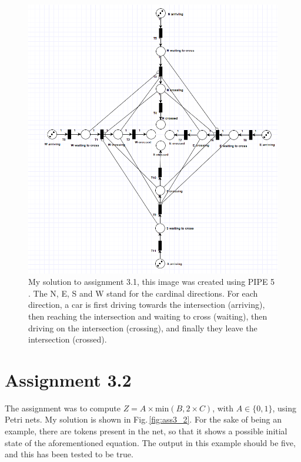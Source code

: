 \documentclass{article}
\begin{document}
	\begin{figure}
		\centering
		\includegraphics[width=1.0\textwidth]{Ass3_1}
		\caption{My solution to assignment 3.1, this image was created using PIPE 5 \cite{dingle2009pipe2, bonet2007pipe}. The N, E, S and W stand for the cardinal directions. For each direction, a car is first driving towards the intersection (arriving), then reaching the intersection and waiting to cross (waiting), then driving on the intersection (crossing), and finally they leave the intersection (crossed). \label{fig:ass3_1}}
	\end{figure}
	
	
	\section{Assignment 3.2}
	\par The assignment was to compute $Z = A \times \textrm{min}(B, 2\times C)$, with $A \in \{0,1\}$, using Petri nets. My solution is shown in Fig.\,\ref{fig:ass3_2}. For the sake of being an example, there are tokens present in the net, so that it shows a possible initial state of the aforementioned equation. The output in this example should be five, and this has been tested to be true.
	
\end{document}
